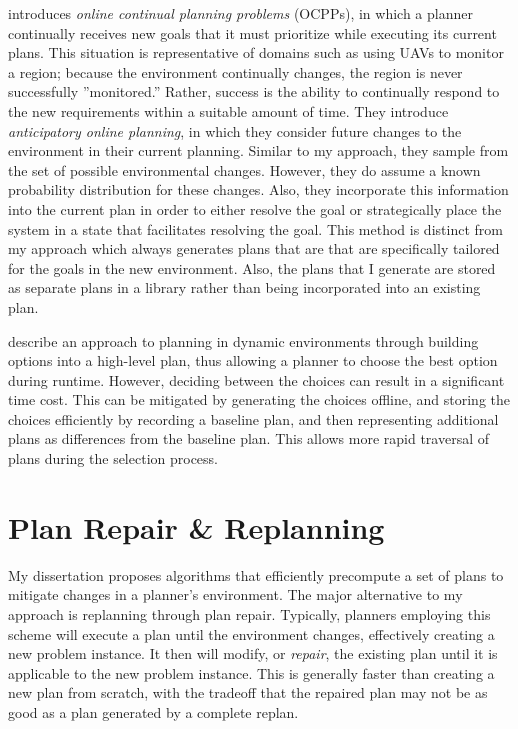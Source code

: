 \cite{DBLP:conf/aips/BurnsBRYD12} introduces \textit{online continual planning problems} (OCPPs), in which a planner continually receives new goals that it must prioritize while executing its current plans.  This situation is representative of domains such as using UAVs to monitor a region; because the environment continually changes, the region is never successfully ''monitored.''  Rather, success is the ability to continually respond to the new requirements within a suitable amount of time.  They introduce \textit{anticipatory online planning}, in which they consider future changes to the environment in their current planning.  Similar to my approach, they sample from the set of possible environmental changes.  However, they do assume a known probability distribution for these changes.  Also, they incorporate this information into the current plan in order to either resolve the goal or strategically place the system in a state that facilitates resolving the goal.  This method is distinct from my approach which always generates plans that are that are  specifically tailored for the goals in the new environment.  Also, the plans that I generate are stored as separate plans in a library rather than being incorporated into an existing plan.

\cite{DBLP:conf/aips/ConradSW09} describe an approach to planning in dynamic environments through building options into a high-level plan, thus allowing a planner to choose the best option during runtime.  However, deciding between the choices can result in a significant time cost.  This can be mitigated by generating the choices offline, and storing the choices efficiently by recording a baseline plan, and then representing additional plans as differences from the baseline plan.  This allows more rapid traversal of plans during the selection process.






\section{Plan Repair \& Replanning}

My dissertation proposes algorithms that efficiently precompute a set of plans to mitigate changes in a planner's environment.  The major alternative to my approach is replanning through plan repair.  Typically, planners employing this scheme will execute a plan until the environment changes, effectively creating a new problem instance.  It then will modify, or \textit{repair}, the existing plan until it is applicable to the new problem instance.  This is generally faster than creating a new plan from scratch, with the tradeoff that the repaired plan may not be as good as a plan generated by a complete replan.


